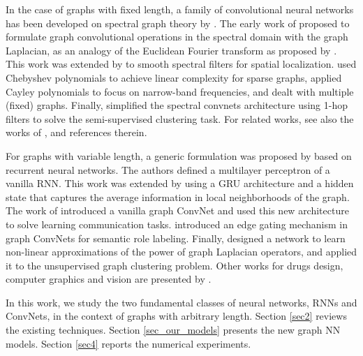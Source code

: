 \documentclass{article} \usepackage{iclr2018_conference,times}
\begin{document}
In the case of graphs with fixed length, a family of convolutional neural networks has been developed on spectral graph theory by \cite{book:Chung97Spectral}. The early work of \cite{art:BrunaZarembaSzlamLeCun13DLgraphs} proposed to formulate graph convolutional operations in the spectral domain with the graph Laplacian, as an analogy of the Euclidean Fourier transform as proposed by \cite{art:HammondVandergheynstGribonval11GraphWav}. This work was extended by \cite{art:HenaffBrunaLeCun15DLgraphs} to smooth spectral filters for spatial localization.  \cite{art:DefferrardBressonVandergheynst16FastSpecCNN} used Chebyshev polynomials to achieve linear complexity for sparse graphs, \cite{art:LevieMontiBressonBronstein17CayleyCNN} applied Cayley polynomials to focus on narrow-band frequencies, and  \cite{art:MontiBronsteinBresson17Recom} dealt with multiple (fixed) graphs. Finally, \cite{art:KipfWelling17GCN} simplified the spectral convnets architecture using 1-hop filters to solve the semi-supervised clustering task. For related works, see also the works of \cite{Bronstein17reviewGDL}, \cite{art:BronsteinBressonSzlamBrunaLeCun17cvpr} and references therein.


For graphs with variable length, a generic formulation was proposed by \cite{art:GoriMonfardiniScarselli05GNN,art:ScarselliGoriTsoiHagenbuchnerMonfardini09} based on recurrent neural networks. The authors defined a multilayer perceptron of a vanilla RNN. This work was  extended by \cite{art:LiTarlowBrockschmidtZemel16GNN} using a GRU architecture and a hidden state that captures the average information in local neighborhoods of the graph. The work of \cite{art:SukhbaatarSzlamFergus16ComAgents} introduced a vanilla graph ConvNet and used this new architecture to solve learning communication tasks. \cite{marcheggiani2017encoding} introduced an edge gating mechanism in graph ConvNets for semantic role labeling. Finally, \cite{art:BrunaLi17ComDetect} designed a network to learn non-linear approximations of the power of graph Laplacian operators, and applied it to the unsupervised graph clustering problem. Other works for drugs design, computer graphics and vision  are presented by \cite{duvenaud2015convolutional,boscaini2016learning,monti2016geometric}.




In this work, we study the two fundamental classes of neural networks, RNNs and ConvNets, in the context of graphs with arbitrary length.  Section \ref{sec2} reviews the existing techniques. Section  \ref{sec_our_models} presents the new graph NN models.  Section \ref{sec4} reports the numerical experiments. 
\end{document}
